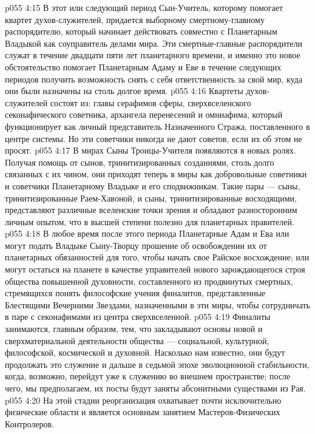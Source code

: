 \vs p055 4:15 В этот или следующий период Сын\hyp{}Учитель, которому помогает квартет духов\hyp{}служителей, придается выборному смертному\hyp{}главному распорядителю, который начинает действовать совместно с Планетарным Владыкой как соуправитель делами мира. Эти смертные\hyp{}главные распорядители служат в течение двадцати пяти лет планетарного времени, и именно это новое обстоятельство помогает Планетарным Адаму и Еве в течение следующих периодов получить возможность снять с себя ответственность за свой мир, куда они были назначены на столь долгое время.
\vs p055 4:16 Квартеты духов\hyp{}служителей состоят из: главы серафимов сферы, сверхвселенского секонафического советника, архангела перенесений и омниафима, который функционирует как личный представитель Назначенного Стража, поставленного в центре системы. Но эти советчики никогда не дают советов, если их об этом не просят.
\vs p055 4:17 \bibnobreakspace {} В мирах Сыны Троицы\hyp{}Учителя появляются в новых ролях. Получая помощь от сынов, тринитизированных созданиями, столь долго связанных с их чином, они приходят теперь в миры как добровольные советники и советчики Планетарному Владыке и его сподвижникам. Такие пары --- сыны, тринитизированные Раем\hyp{}Хавоной, и сыны, тринитизированные восходящими, представляют различные вселенские точки зрения и обладают разносторонним личным опытом, что в высшей степени полезно для планетарных правителей.
\vs p055 4:18 В любое время после этого периода Планетарные Адам и Ева или могут подать Владыке Сыну\hyp{}Творцу прошение об освобождении их от планетарных обязанностей для того, чтобы начать свое Райское восхождение; или могут остаться на планете в качестве управителей нового зарождающегося строя общества повышенной духовности, составленного из продвинутых смертных, стремящихся понять философские учения финалитов, представленные Блестящими Вечерними Звездами, назначенными в эти миры, чтобы сотрудничать в паре с секонафимами из центра сверхвселенной.
\vs p055 4:19 Финалиты занимаются, главным образом, тем, что закладывают основы новой и сверхматериальной деятельности общества --- социальной, культурной, философской, космической и духовной. Насколько нам известно, они будут продолжать это служение и дальше в седьмой эпохе эволюционной стабильности, когда, возможно, перейдут уже к служению во внешнем пространстве; после чего, мы предполагаем, их посты будут заняты абсонитными существами из Рая.
\vs p055 4:20 \pc {}\bibnobreakspace {} На этой стадии реорганизация охватывает почти исключительно физические области и является основным занятием Мастеров\hyp{}Физических Контролеров.
